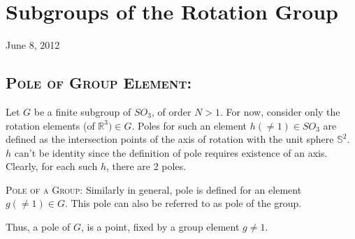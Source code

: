 \chapter{Subgroups of the Rotation Group}
\begin{flushright} {\small June 8, 2012} \end{flushright}
\section{\textsc {Pole of Group Element: }}
 Let $G$ be a finite subgroup of $SO_{3}$, of order $N > 1$. For now, consider only the rotation elements (of $\mathbb{R}^3) \in G$. Poles for such an element $h(\neq 1) \in SO_{3}$ are defined as the intersection points of the axis of rotation with the unit sphere $\mathbb{S}^2$. $h$ can't be identity since the definition of pole requires existence of an axis. Clearly, for each such $h$, there are 2 poles.
\par
\textsc {Pole of a Group: } Similarly in general, pole is defined for an element $g(\neq 1) \in G$. This pole can also be referred to as pole of the group.
\par
Thus, a pole of $G$, is a point, fixed by a group element $g \neq 1$.\\
\par
